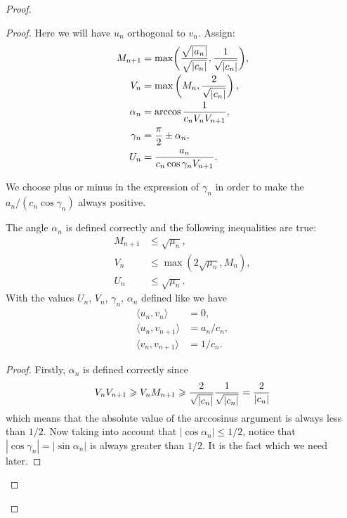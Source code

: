 \begin{proof}
\begin{proof}
          Here we will have $u_n$ orthogonal to $v_n$.
          Assign:
          \begin{align*}
            M_{n+1} &= \max\biggl(\smash[b]{\frac{\sqrt{|a_n|}}{\sqrt{|c_n|}}}, \frac{1}{\sqrt{\smash[b]{|c_n|}}}\biggr),\\
            V_n &= \max\left(M_n, \frac{2}{\sqrt{\smash[b]{|c_n|}}}\right),\\
            \alpha_n &= \arccos{\frac{1}{c_n V_n V_{n+1}}},\\
            \gamma_n &= \frac{\pi}{2} \pm \alpha_n,\\
            U_n &= \frac{a_n}{c_n \cos{\gamma_n} V_{n+1}}.
          \end{align*}
          \begin{remark*}
            We choose plus or minus in the expression of $\gamma_n$ in order to make the $a_n/(c_n \cos{\gamma_n})$ always positive.
          \end{remark*}
          \begin{prop}
            The angle $\alpha_n$ is defined correctly and the following inequalities are true:
            \begin{align*}
                M_{n+1} &\leq \sqrt{\mu_n},\\
                V_n &\leq \max(2\sqrt{\mu_n}, M_n),\\
                U_n &\leq \sqrt{\mu_n}.
            \end{align*}
            With the values $U_n$, $V_n$, $\gamma_n$, $\alpha_n$ defined like we have
            \begin{align*}
              \langle u_n, v_n \rangle &= 0,\\
              \langle u_n, v_{n+1} \rangle &= a_n/c_n,\\
              \langle v_n, v_{n+1} \rangle &= 1/c_n.
            \end{align*}
          \end{prop}
          \begin{proof}
            Firstly, $\alpha_n$ is defined correctly since
            \[
              V_n V_{n+1} \geq V_n M_{n+1} \geq \frac{2}{\sqrt{\smash[b]{|c_n|}}} \frac{1}{\sqrt{\smash[b]{|c_n|}}} = \frac{2}{|c_n|}
            \]
            which means that the absolute value of the arccosinus argument is always less than $1/2$.
            Now taking into account that $|\cos{\alpha_n}| \leq 1/2$, notice that $|\cos{\gamma_n}| = |\sin{\alpha_n}|$ is always greater than $1/2$.
            It is the fact which we need later.
            

\end{proof}
\end{proof}
\end{proof}
